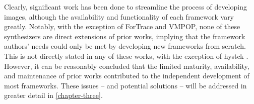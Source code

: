 Clearly, significant work has been done to streamline the process of
developing images, although the availability and functionality of each
framework vary greatly. Notably, with the exception of ForTrace and
VMPOP, none of these synthesizers are direct extensions of prior works,
implying that the framework authors' needs could only be met by
developing new frameworks from scratch. This is not directly stated in
any of these works, with the exception of hystck
\cite{gobelNovelApproachGenerating2020}. However, it can be
reasonably concluded that the limited maturity, availability, and
maintenance of prior works contributed to the independent development of
most frameworks. These issues -- and potential solutions -- will be
addressed in greater detail in \autoref{chapter-three}.

